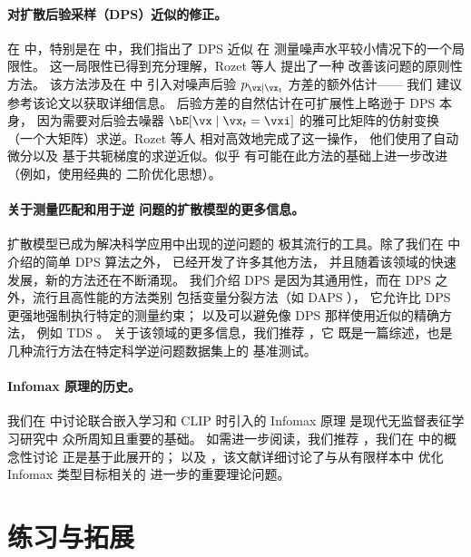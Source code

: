 \documentclass[../../book-main_zh.tex]{subfiles}
\begin{document}
\paragraph{对扩散后验采样（DPS）近似的修正。}
在  中，特别是在
 中，我们指出了
DPS 近似
 在
测量噪声水平较小情况下的一个局限性。
这一局限性已得到充分理解，Rozet 等人 \cite{rozet2024learning} 提出了一种
改善该问题的原则性方法。
该方法涉及在  中
引入对噪声后验 $p_{\vx \mid \vx_t}$ 方差的额外估计——
我们
建议参考该论文以获取详细信息。
后验方差的自然估计在可扩展性上略逊于 DPS 本身，
因为需要对后验去噪器 $\bE[\vx \mid \vx_t=\vxi]$ 的雅可比矩阵的仿射变换
（一个大矩阵）求逆。Rozet 等人 \cite{rozet2024learning}
相对高效地完成了这一操作，
他们使用了自动微分以及
基于共轭梯度的求逆近似。似乎
有可能在此方法的基础上进一步改进（例如，使用经典的
二阶优化思想）。

\paragraph{关于测量匹配和用于逆
问题的扩散模型的更多信息。}

扩散模型已成为解决科学应用中出现的逆问题的
极其流行的工具。除了我们在  中
介绍的简单 DPS 算法之外，
已经开发了许多其他方法，
并且随着该领域的快速发展，新的方法还在不断涌现。
我们介绍 DPS 是因为其通用性，而在 DPS 之外，流行且高性能的方法类别
包括变量分裂方法（如 DAPS
\cite{Zhang2024-ha}），
它允许比 DPS 更强地强制执行特定的测量约束；
以及可以避免像 DPS 那样使用近似的精确方法，
例如 TDS \cite{wu2023practical}。
关于该领域的更多信息，我们推荐 \cite{zheng2025inversebench}，它
既是一篇综述，也是几种流行方法在特定科学逆问题数据集上的
基准测试。

\paragraph{Infomax 原理的历史。}
我们在  中讨论联合嵌入学习和 CLIP 时引入的
Infomax 原理 \cite{infomax} 是现代无监督表征学习研究中
众所周知且重要的基础。
如需进一步阅读，我们推荐
\cite{Van_den_Oord2018-qf}，我们在  中的概念性讨论
正是基于此展开的；
以及 \cite{Oko2025-wk}，该文献详细讨论了与从有限样本中
优化 Infomax 类型目标相关的
进一步的重要理论问题。

\section{练习与拓展}
\end{document}
